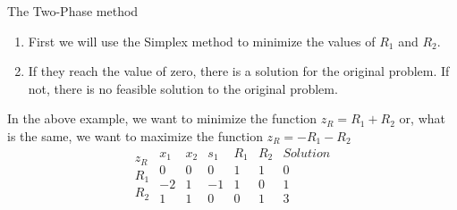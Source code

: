 \documentclass[c]{beamer}
\begin{document}
\begin{frame}[allowframebreaks]{The Two-Phase method}

  \begin{enumerate}
    \item First we will use the Simplex method to minimize the values of $R_1$ and $R_2$. 
    \item If they reach the value of zero, there is a solution for the original problem. If not, there is no feasible solution to the original problem.
  \end{enumerate}
  In the above example, we want to minimize the function $z_R=R_1+R_2$ or, what is the same, we want to maximize the function $z_R=-R_1-R_2$
  \begin{equation*}
    \begin{array}{c}
    \\
    z_R\\
    R_1\\
    R_2\\
    \end{array}
    \begin{array}{ccccc|c}
       x_1 & x_2 & s_1 & R_1 & R_2 & Solution \\ \hline
       0 & 0 & 0 & 1 & 1 & 0 \\ \hline
       -2 & 1 & -1 & 1 & 0 & 1  \\
       1 & 1 & 0 & 0 & 1 & 3 \\
    \end{array}
    \end{equation*}


\end{frame}
\end{document}
